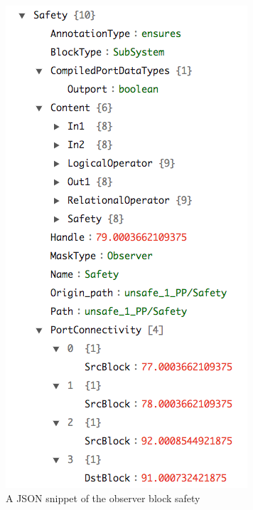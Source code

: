 \documentclass{article}
\begin{document}
\begin{figure}[h]
\begin{center}
  \includegraphics[scale=0.5]{figures/safety}
\end{center}  
  \caption{A JSON snippet of the observer block safety}
  \label{jsonsafety}
\end{figure}
\end{document}

